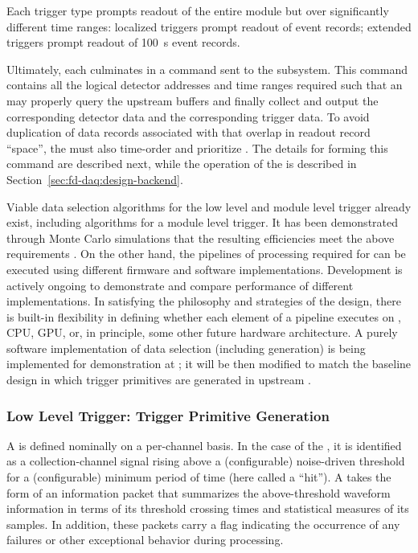 \noindent Each trigger type prompts readout
of the entire module but over significantly different time
ranges: localized triggers prompt readout of \spreadout event records; extended
triggers prompt readout of \SI{100}{\second} event records. 

Ultimately, each  culminates in a command sent to
the  subsystem. 
This command contains all the logical detector addresses and time ranges
required such that an  may properly query the upstream 
buffers and finally collect and output the corresponding detector data
and the corresponding trigger data. To avoid duplication of data
records associated with  that overlap in readout
record ``space'', the  must also time-order and
prioritize . The details for forming this
command are described next, while the operation of the  is
described in Section~\ref{sec:fd-daq:design-backend}.

Viable data selection algorithms for the low level and module level trigger already exist, including
algorithms for a module level  trigger.  It has
been demonstrated through Monte Carlo simulations that the resulting efficiencies meet the above
requirements \cite{bib:docdb11215,bib:docdb14522}. On the other hand, the pipelines of processing required
for  can be executed using different firmware and software
implementations. Development is actively ongoing to demonstrate
and compare performance of different implementations. In satisfying
the philosophy and strategies of the  design, there is built-in
flexibility in defining whether each element of a pipeline executes on
, CPU, GPU, or, in principle, some other future hardware
architecture. A purely software implementation of data selection
(including  generation) is being
implemented for demonstration at ; it will be then
modified to match the baseline design in which trigger primitives are
generated in upstream  .


\subsubsection{Low Level Trigger: Trigger Primitive Generation}
\label{sec:sp-daq:design-trigger-primitives}

A  is defined nominally on a per-channel basis. In the case of
the  , it is identified as a
collection-channel signal rising above a (configurable) noise-driven
threshold for a (configurable) minimum period of time (here called a
``hit'').
A  takes the form of an information packet that 
summarizes the above-threshold waveform information in terms of its
threshold crossing times and statistical measures of its  samples. 
In addition, these packets carry a flag indicating the occurrence of any
failures or other exceptional behavior during  processing.

